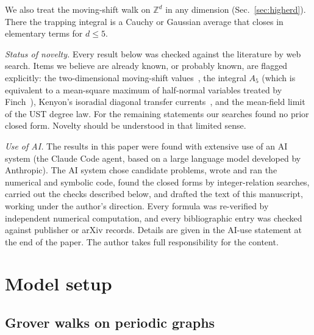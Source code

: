 \documentclass[aps,pra,10pt,twocolumn,superscriptaddress,nofootinbib]{revtex4-2}
\begin{document}
We also treat the moving-shift walk on $\mathbb{Z}^d$ in any dimension
(Sec.~\ref{sec:higherd}). There the trapping integral is a Cauchy or Gaussian average that
closes in elementary terms for $d\le5$.

\emph{Status of novelty.} Every result below was checked against the literature by
web search. Items we believe are already known, or probably known, are flagged
explicitly: the two-dimensional moving-shift values~\cite{Inui2004}, the integral
$A_5$ (which is equivalent to a mean-square maximum of half-normal variables
treated by Finch~\cite{Finch2011}), Kenyon's isoradial diagonal transfer
currents~\cite{Kenyon2002}, and the mean-field limit of the UST degree law. For the
remaining statements our searches found no prior closed form. Novelty should be
understood in that limited sense.

\emph{Use of AI.} The results in this paper were found with extensive use of an AI
system (the Claude Code agent, based on a large language model developed by Anthropic). The AI
system chose candidate problems, wrote and ran the numerical and symbolic code, found the
closed forms by integer-relation searches, carried out the checks described below, and drafted
the text of this manuscript, working under the author's direction. Every formula was
re-verified by independent numerical computation, and every bibliographic entry was checked
against publisher or arXiv records. Details are given in the AI-use statement at the end of
the paper. The author takes full responsibility for the content.

\section{Model setup}
\label{sec:model}

\subsection{Grover walks on periodic graphs}
\end{document}
